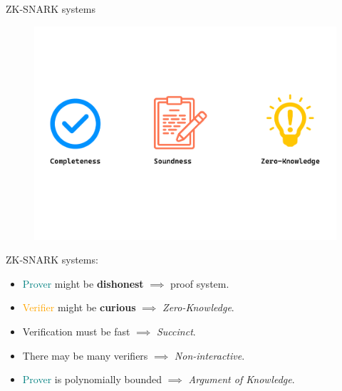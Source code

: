 \documentclass[beamer={10pt,xcolor=dvipsnames},target=mst]{thud}
\begin{document}
\begin{frame}{ZK-SNARK systems}
  \begin{figure}
    \centering
      \includegraphics[scale=0.25]{res/Zero-Knowledge-Proofs-Properties.pdf}
  \end{figure}
  ZK-SNARK systems:
  \begin{itemize}
    \item \textcolor{teal}{Prover} might be \textbf{dishonest} \(\implies \) proof system.
    \item \textcolor{orange}{Verifier} might be \textbf{curious} \(\implies \) \emph{Zero-Knowledge}.
    \item Verification must be fast \(\implies \) \emph{Succinct}.
    \item There may be many verifiers  \(\implies \) \emph{Non-interactive}.
    \item \textcolor{teal}{Prover} is polynomially bounded \(\implies \) \emph{Argument of Knowledge}.
  \end{itemize}
\end{frame}
\end{document}
